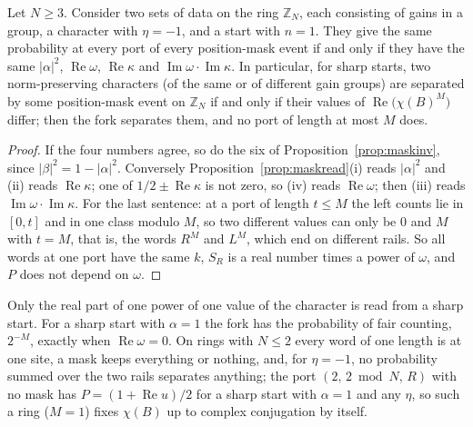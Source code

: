 \begin{corollary}\label{cor:masklist}
Let $N\ge3$. Consider two sets of data on the ring $\mathbb{Z}_N$, each consisting of gains in a group, a character with $\eta=-1$, and a start with $n=1$. They give the same probability at every port of every position-mask event if and only if they have the same $|\alpha|^{2}$, $\operatorname{Re}\omega$, $\operatorname{Re}\kappa$ and $\operatorname{Im}\omega\cdot\operatorname{Im}\kappa$. In particular, for sharp starts, two norm-preserving characters (of the same or of different gain groups) are separated by some position-mask event on $\mathbb{Z}_N$ if and only if their values of $\operatorname{Re}\bigl(\chi(B)^{M}\bigr)$ differ; then the fork separates them, and no port of length at most $M$ does.
\end{corollary}
\begin{proof}
If the four numbers agree, so do the six of Proposition~\ref{prop:maskinv}, since $|\beta|^{2}=1-|\alpha|^{2}$. Conversely Proposition~\ref{prop:maskread}(i) reads $|\alpha|^{2}$ and (ii) reads $\operatorname{Re}\kappa$; one of $1/2\pm\operatorname{Re}\kappa$ is not zero, so (iv) reads $\operatorname{Re}\omega$; then (iii) reads $\operatorname{Im}\omega\cdot\operatorname{Im}\kappa$. For the last sentence: at a port of length $t\le M$ the left counts lie in $[0,t]$ and in one class modulo $M$, so two different values can only be $0$ and $M$ with $t=M$, that is, the words $R^{M}$ and $L^{M}$, which end on different rails. So all words at one port have the same $k$, $S_R$ is a real number times a power of $\omega$, and $P$ does not depend on $\omega$.
\end{proof}

Only the real part of one power of one value of the character is read from a sharp start. For a sharp start with $\alpha=1$ the fork has the probability of fair counting, $2^{-M}$, exactly when $\operatorname{Re}\omega=0$. On rings with $N\le2$ every word of one length is at one site, a mask keeps everything or nothing, and, for $\eta=-1$, no probability summed over the two rails separates anything; the port $(2,\,2\bmod N,\,R)$ with no mask has $P=(1+\operatorname{Re}u)/2$ for a sharp start with $\alpha=1$ and any $\eta$, so such a ring ($M=1$) fixes $\chi(B)$ up to complex conjugation by itself.

